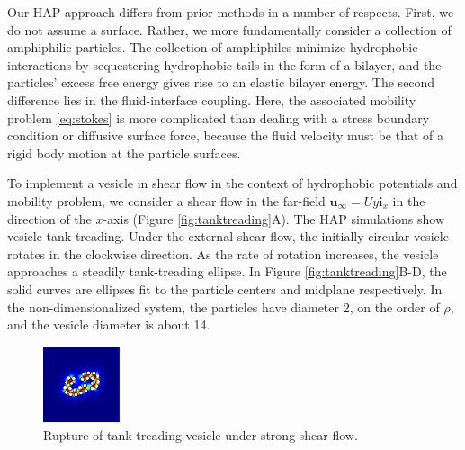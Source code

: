 Our HAP approach differs from prior methods in a number of respects. 
First, we do not assume a surface. Rather, we more fundamentally  consider a collection of amphiphilic particles.
The collection of amphiphiles minimize hydrophobic interactions by sequestering hydrophobic tails in the form of a bilayer, and the particles' excess free energy gives rise to an elastic bilayer energy. 
The second difference lies in the fluid-interface coupling. Here, the associated mobility problem \eqref{eq:stokes} 
is more complicated than dealing with a stress boundary condition or diffusive surface force, 
because the fluid velocity must be that of a rigid body motion at the particle surfaces.

To implement a vesicle in shear flow in the context of hydrophobic potentials and mobility problem, 
we consider a shear flow in the far-field $\mathbf{u}_{\infty} = Uy\mathbf{i}_x$ in the direction of the $x$-axis
(Figure \ref{fig:tanktreading}A).
%
%
The HAP simulations show vesicle tank-treading. Under the external shear flow, the initially circular 
vesicle rotates in the clockwise direction. As the rate of rotation increases, the vesicle approaches
a steadily tank-treading ellipse. In Figure \ref{fig:tanktreading}B-D, the solid curves are ellipses fit to the particle centers
and midplane respectively. In the non-dimensionalized system, the particles have diameter 2, on the order of $\rho,$ 
and the vesicle diameter is about 14. 
%
\begin{figure}
\centerline{\includegraphics[width=0.2\textwidth]{figures/PW_fig5.pdf}}
\caption{\label{fig:rupture} Rupture of tank-treading vesicle under strong shear flow.}
\end{figure}

